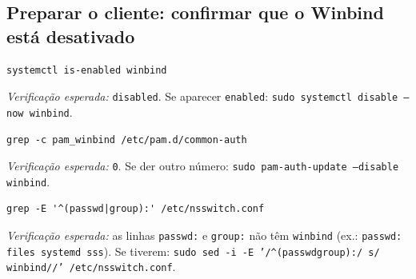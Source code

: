 
\subsection[Preparar o cliente: confirmar que o Winbind está desativado]{Preparar o cliente: confirmar que o Winbind está desativado}


\begin{lstlisting}[style=bashstyle]
systemctl is-enabled winbind
\end{lstlisting}

\emph{Verificação esperada:} \texttt{disabled}. Se aparecer \texttt{enabled}: \texttt{sudo systemctl disable --now winbind}.


\begin{lstlisting}[style=bashstyle]
grep -c pam_winbind /etc/pam.d/common-auth
\end{lstlisting}

\emph{Verificação esperada:} \texttt{0}. Se der outro número: \texttt{sudo pam-auth-update --disable winbind}.


\begin{lstlisting}[style=bashstyle]
grep -E '^(passwd|group):' /etc/nsswitch.conf
\end{lstlisting}

\emph{Verificação esperada:} as linhas \texttt{passwd:} e \texttt{group:} não têm \texttt{winbind} (ex.: \texttt{passwd: files systemd sss}). Se tiverem: \texttt{sudo sed -i -E '/\allowbreak{}\textasciicircum{}(passwd\textbar{}group):/\allowbreak{} s/\allowbreak{} winbind/\allowbreak{}/\allowbreak{}' /\allowbreak{}etc/\allowbreak{}nsswitch.conf}.

